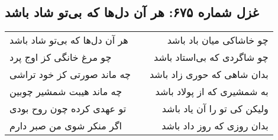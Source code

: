\begin{center}
\section*{غزل شماره ۶۷۵: هر آن دل‌ها که بی‌تو شاد باشد}
\label{sec:0675}
\begin{longtable}{l p{0.5cm} r}
هر آن دل‌ها که بی‌تو شاد باشد
&&
چو خاشاکی میان باد باشد
\\
چو مرغ خانگی کز اوج پرد
&&
چو شاگردی که بی‌استاد باشد
\\
چه ماند صورتی کز خود تراشی
&&
بدان شاهی که حوری زاد باشد
\\
چه ماند هیبت شمشیر چوبین
&&
به شمشیری که از پولاد باشد
\\
تو عهدی کرده چون روح بودی
&&
ولیکن کی تو را آن یاد باشد
\\
اگر منکر شوی من صبر دارم
&&
بدان روزی که روز داد باشد
\\
\end{longtable}
\end{center}
